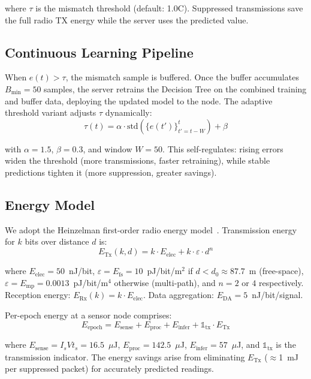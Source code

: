 \documentclass[conference]{IEEEtran}
\begin{document}
where $\tau$ is the mismatch threshold (default: 1.0\textdegree C). Suppressed transmissions save the full radio TX energy while the server uses the predicted value.

\subsection{Continuous Learning Pipeline}

When $e(t) > \tau$, the mismatch sample is buffered. Once the buffer accumulates $B_{\min} = 50$ samples, the server retrains the Decision Tree on the combined training and buffer data, deploying the updated model to the node. The adaptive threshold variant adjusts $\tau$ dynamically:
\begin{equation}
\tau(t) = \alpha \cdot \text{std}\!\left(\{e(t')\}_{t'=t-W}^{t}\right) + \beta
\label{eq:adaptive}
\end{equation}

with $\alpha = 1.5$, $\beta = 0.3$, and window $W = 50$. This self-regulates: rising errors widen the threshold (more transmissions, faster retraining), while stable predictions tighten it (more suppression, greater savings).

\subsection{Energy Model}

We adopt the Heinzelman first-order radio energy model~\cite{Heinzelman2000LEACH}. Transmission energy for $k$ bits over distance $d$ is:
\begin{equation}
E_{\text{Tx}}(k, d) = k \cdot E_{\text{elec}} + k \cdot \varepsilon \cdot d^n
\label{eq:etx}
\end{equation}

where $E_{\text{elec}} = 50$~nJ/bit, $\varepsilon = E_{\text{fs}} = 10$~pJ/bit/m$^2$ if $d < d_0 \approx 87.7$~m (free-space), $\varepsilon = E_{\text{mp}} = 0.0013$~pJ/bit/m$^4$ otherwise (multi-path), and $n = 2$ or $4$ respectively. Reception energy: $E_{\text{Rx}}(k) = k \cdot E_{\text{elec}}$. Data aggregation: $E_{\text{DA}} = 5$~nJ/bit/signal.

Per-epoch energy at a sensor node comprises:
\begin{equation}
E_{\text{epoch}} = E_{\text{sense}} + E_{\text{proc}} + E_{\text{infer}} + \mathbb{1}_{\text{tx}} \cdot E_{\text{Tx}}
\label{eq:epoch}
\end{equation}

where $E_{\text{sense}} = I_s V t_s = 16.5$~$\mu$J, $E_{\text{proc}} = 142.5$~$\mu$J, $E_{\text{infer}} = 57$~$\mu$J, and $\mathbb{1}_{\text{tx}}$ is the transmission indicator. The energy savings arise from eliminating $E_{\text{Tx}}$ ($\approx$1~mJ per suppressed packet) for accurately predicted readings.
\end{document}
